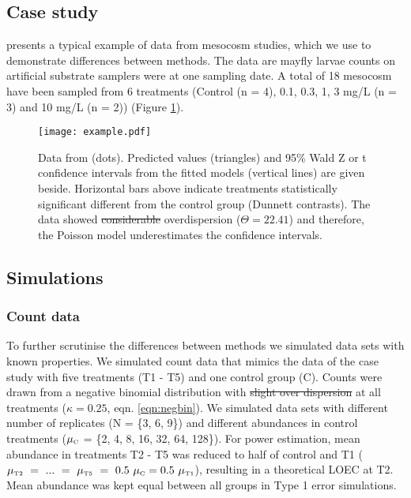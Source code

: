 \documentclass[twocolumn, natbib]{svjour3}
\providecommand{\DIFadd}[1]{{\protect\color{blue}\uwave{#1}}} %
\providecommand{\DIFdel}[1]{{\protect\color{red}\sout{#1}}}                      %
\providecommand{\DIFaddbegin}{} %
\providecommand{\DIFaddend}{} %
\providecommand{\DIFdelbegin}{} %
\providecommand{\DIFdelend}{} %
\providecommand{\DIFaddFL}[1]{\DIFadd{#1}} %
\providecommand{\DIFdelFL}[1]{\DIFdel{#1}} %
\providecommand{\DIFaddbeginFL}{} %
\providecommand{\DIFaddendFL}{} %
\providecommand{\DIFdelbeginFL}{} %
\providecommand{\DIFdelendFL}{} %
\begin{document}
\subsection{Case study}
\citet{brock_minimum_2015} presents a typical example of data from mesocosm studies, which we use to demonstrate differences between methods.
The data are mayfly larvae counts on artificial substrate samplers were at one sampling date. 
A total of 18 mesocosm have been sampled from 6 treatments (Control (n = 4), 0.1, 0.3, 1, 3 mg/L (n = 3) and 10 mg/L (n = 2)) (Figure \ref{fig:example}).

\DIFdelbegin %
\DIFdelendFL \DIFaddbeginFL \begin{figure}[h]
  \DIFaddendFL \centering
  \texttt{[image: example.pdf]}
  \caption{Data from \citet{brock_minimum_2015} (dots). 
  Predicted values (triangles) and 95\% Wald Z or t confidence intervals from the fitted models (vertical lines) are given beside.
  Horizontal bars above indicate treatments statistically significant different from the control group (Dunnett contrasts).
  The data showed \DIFdelbeginFL \DIFdelFL{considerable }\DIFdelendFL overdispersion (\DIFdelbeginFL \DIFdelFL{$\Theta = 22.41$}\DIFdelendFL \DIFaddbeginFL \DIFaddFL{$\kappa = 0.26$}\DIFaddendFL ) and therefore, the Poisson model underestimates the \DIFaddbeginFL \DIFaddFL{width of }\DIFaddendFL confidence intervals.
  }
  \label{fig:example}
\end{figure}


\subsection{Simulations}
\subsubsection{Count data}
To further scrutinise the differences between methods we simulated data sets with known properties.
We simulated count data that mimics the data of the case study with five treatments (T1 - T5) and one control group (C).
Counts were drawn from a negative binomial distribution with \DIFdelbegin \DIFdel{slight over dispersion }\DIFdelend \DIFaddbegin \DIFadd{overdispersion }\DIFaddend at all treatments ($\kappa = 0.25$, eqn. \ref{eqn:negbin}).
We simulated data sets with different number of replicates (N = \{3, 6, 9\}) and different abundances in control treatments ($\mu_\text{\tiny C}$ = \{2, 4, 8, 16, 32, 64, 128\}). 
For power estimation, mean abundance in treatments T2 - T5 was reduced to half of control and T1 ($\mu_\text{\tiny T2}~=~...~=~\mu_\text{\tiny T5}~=~0.5~\mu_\text{\tiny C} = 0.5~\mu_\text{\tiny T1}$), resulting in a theoretical LOEC at T2.
Mean abundance was kept equal between all groups in Type 1 error simulations.
\DIFdelbegin %
\end{document}
